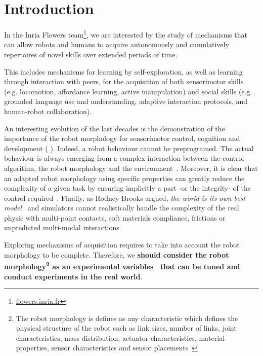 
\cleartoleftpage


\chapter{Introduction} %


In the Inria Flowers team\footnote{\url{flowers.inria.fr}}, we are interested by the study of mechanisms that can allow robots and humans to acquire autonomously and cumulatively repertoires of novel skills over extended periods of time.

This includes mechanisms for learning by self-exploration, as well as learning through interaction with peers, for the acquisition of both sensorimotor skills (e.g. locomotion, affordance learning, active manipulation) and social skills (e.g. grounded language use and understanding, adaptive interaction protocols, and human-robot collaboration).

An interesting evolution of the last decades is the demonstration of the importance of the robot morphology for sensorimotor control, cognition and development (\cite{kaplan2008corps} \cite{steels1995artificial} \cite{Pfeifer06}). Indeed, a robot behaviour cannot be preprogramed. The actual behaviour is always emerging from a complex interaction between the control algorithm, the robot morphology and the environment~\cite{Steels1991emergence}. Moreover, it is clear that an adapted robot morphology using specific properties can greatly reduce the complexity of a given task by ensuring implicitly a part -or the integrity- of the control required~\cite{pfeifer2005morphological}.
Finally, as Rodney Brooks argued, \emph{the world is its own best model}~\cite{brooks1991intelligence} and simulators cannot realistically handle the complexity of the real physic with multi-point contacts, soft materials compliance, frictions or unpredicted multi-modal interactions.


Exploring mechanisms of acquisition requires to take into account the robot morphology to be complete.
Therefore, we \textbf{should consider the robot morphology\footnote{The robot morphology is defines as any characteristic which defines the physical structure of the robot such as link sizes, number of links, joint characteristics, mass distribution, actuator characteristics, material properties, sensor characteristics and sensor placements~\cite{paul2006morphological}} as an experimental variables~\cite{kaplan2008corps} that can be tuned and conduct experiments in the real world}.

